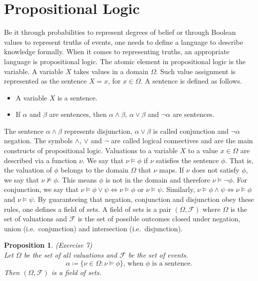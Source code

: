 \documentclass{amsart}
\theoremstyle{plain}
\newtheorem*{proposition}{Proposition}
\begin{document}
\section{Propositional Logic}

Be it through probabilities to represent degrees of belief or through Boolean values to represent
truths of events, one needs to define a language to describe knowledge formally. When it comes to
representing truths, an appropriate language is propositional logic. The atomic element in
propositional logic is the variable. A variable $X$ takes values in a domain $\Omega$. Such value
assignment is represented as the sentence $X=x$, for $x\in \Omega$. A sentence is defined as
follows.

\begin{itemize}
  \item A variable $X$ is a sentence.
  \item If $\alpha$ and $\beta$ are sentences, then $\alpha \wedge \beta$, $\alpha \vee \beta$ and
    $\neg \alpha$ are sentences.
\end{itemize}

The sentence $\alpha \wedge \beta$ represents disjunction, $\alpha \vee \beta$ is called
conjunction and $\neg \alpha$ negation. The symbols $\wedge$, $\vee$ and $\neg$ are called logical
connectives and are the main constructs of propositional logic. Valuations to a variable $X$ to a
value $x\in \Omega$ are described via a function $\nu$. We say that $\nu \models \phi$ if $\nu$
satisfies the sentence $\phi$. That is, the valuation of $\phi$ belongs to the domain $\Omega$ that
$\nu$ maps. If $\nu$ does not satisfy $\phi$, we say that $\nu \not\models \phi$. This means $\phi$
is not in the domain and therefore $\nu \models \neg \phi$. For conjunction, we say that $\nu
\models \phi \vee \psi \iff \nu \models \phi$ or $\nu \models \psi$. Similarly, $\nu \models \phi
\wedge \psi \iff \nu \models \phi$ and $\nu \models \psi$. By guaranteeing that negation,
conjunction and disjunction obey these rules, one defines a field of sets. A field of sets is a
pair $(\Omega,\mathcal{F})$ where $\Omega$ is the set of valuations and $\mathcal{F}$ is the set
of possible outcomes closed under negation, union (i.e.\ conjunction) and intersection (i.e.\
disjunction).

\begin{proposition} (Exercise 7)\\
  Let $\Omega$ be the set of all valuations and $\mathcal{F}$ be the set of events.
  \begin{equation*}
    \alpha \coloneqq \{\nu \in \Omega : \nu \models \phi\}\text{, when $\phi$ is a sentence.}
  \end{equation*}
  Then $(\Omega,\mathcal{F})$ is a field of sets.
\end{proposition}
\end{document}
